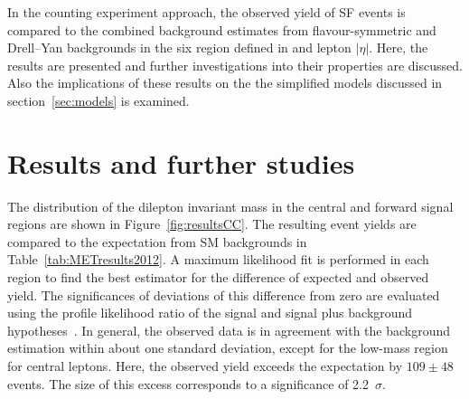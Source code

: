 \label{sec:counting}
In the counting experiment approach, the observed yield of SF events is compared to the combined background estimates from flavour-symmetric and Drell--Yan backgrounds in the six region defined in \mll and lepton $|\eta|$. Here, the results are presented and further investigations into their properties are discussed. Also the implications of these results on the the simplified models discussed in section~\ref{sec:models} is examined.  
\section{Results and further studies}

\label{sec:candcresults}
The distribution of the dilepton invariant mass in the central and forward signal regions are shown in Figure~\ref{fig:resultsCC}. The resulting event yields are compared to the expectation from SM backgrounds in Table~\ref{tab:METresults2012}. A maximum likelihood fit is performed in each region to find the best estimator for the difference of expected and observed yield. The significances of deviations of this difference from zero are evaluated using the profile likelihood ratio of the signal and signal plus background hypotheses~\cite{HiggsTool1}. In general, the observed data is in agreement with the background estimation within about one standard deviation, except for the low-mass region for central leptons. Here, the observed yield exceeds the expectation by $109\pm48$ events. The size of this excess corresponds to a significance of 2.2~$\sigma$.  
